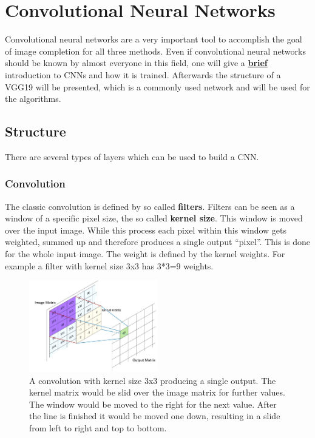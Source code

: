 \documentclass[
     11pt,         %
     a4paper,      %
     oneside,
     ]{article}
\begin{document}
\section{Convolutional Neural Networks}
Convolutional neural networks are a very important tool to accomplish the goal of image completion for all three methods. Even if convolutional neural networks should be known by almost everyone in this field, one will give a \underline{\textbf{brief}} introduction to CNNs and how it is trained. Afterwards the structure of a VGG19 will be presented, which is a commonly used network and will be used for the algorithms.
\subsection{Structure}
There are several types of layers which can be used to build a CNN.
\subsubsection{Convolution}
The classic convolution is defined by so called \textbf{filters}. Filters can be seen as a window of a specific pixel size, the so called \textbf{kernel size}. This window is moved over the input image. While this process each pixel within this window gets weighted, summed up and therefore produces a single output \enquote{pixel}. This is done for the whole input image. The weight is defined by the kernel weights. For example a filter with kernel size 3x3 has 3*3=9 weights. \cite{neuralnetworksanddeeplearning}
\begin{figure}[H]
  \begin{center}
    \includegraphics[width=0.5\textwidth]{images/1.JPG}
    \caption{A convolution with kernel size 3x3 producing a single output. The kernel matrix would be slid over the image matrix for further values. The window would be moved to the right for the next value. After the line is finished it would be moved one down, resulting in a slide from left to right and top to bottom.\cite{conv1}}
    \label{fig:conv}
  \end{center}
\end{figure}
\end{document}
